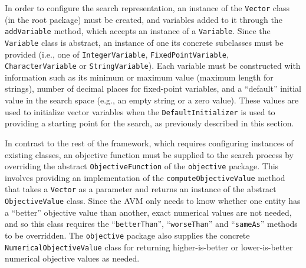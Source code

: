 \documentclass{llncs}
\newcommand{\inlineheading}[1]{\vspace{1mm} \noindent {\bf #1.}}
\begin{document}
\begin{sloppypar}
\inlineheading{Representation} In order to configure the search representation, an instance of the {\tt Vector} class (in the root package) must be created, and variables added to it through the {\tt addVariable} method, which accepts an instance of a {\tt Variable}. Since the {\tt Variable} class is abstract, an instance of one its concrete subclasses must be provided (i.e., one of {\tt IntegerVariable}, {\tt FixedPointVariable}, {\tt CharacterVariable} or {\tt StringVariable}). Each variable must be constructed with information such as its minimum or maximum value (maximum length for strings), number of decimal places for fixed-point variables, and a ``default'' initial value in the search space (e.g., an empty string or a zero value). These values are used to initialize vector variables when the {\tt DefaultInitializer} is used to providing a starting point for the search, as previously described in this section.
\end{sloppypar}


\begin{sloppypar} \inlineheading{Objective Function} In contrast to the rest of the framework, which requires configuring instances of existing classes, an objective function must be supplied to the search process by overriding the abstract {\tt ObjectiveFunction} of the {\tt objective} package. This involves providing an implementation of the {\tt computeObjectiveValue} method that takes a {\tt Vector} as a parameter and returns an instance of the abstract {\tt ObjectiveValue} class. Since the AVM only needs to know whether one entity has a ``better'' objective value than another, exact numerical values are not needed, and so this class requires the ``{\tt betterThan}'', ``{\tt worseThan}'' and ``{\tt sameAs}'' methods to be overridden.
The {\tt objective} package also supplies the concrete {\tt NumericalObjectiveValue} class for returning higher-is-better or lower-is-better numerical objective values as needed.
\end{sloppypar}
\end{document}

